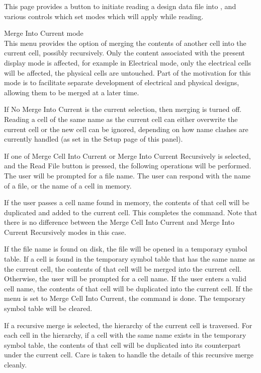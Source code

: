 This page provides a button to initiate reading a design data file
into {\Xic}, and various controls which set modes which will apply
while reading.

\begin{description}
\item{\cb Merge Into Current mode}\\
This menu provides the option of merging the contents of another cell
into the current cell, possibly recursively.  Only the content
associated with the present display mode is affected, for example in
Electrical mode, only the electrical cells will be affected, the
physical cells are untouched.  Part of the motivation for this mode is
to facilitate separate development of electrical and physical designs,
allowing them to be merged at a later time.

If {\cb No Merge Into Current} is the current selection, then merging
is turned off.  Reading a cell of the same name as the current cell
can either overwrite the current cell or the new cell can be ignored,
depending on how name clashes are currently handled (as set in the
{\cb Setup} page of this panel).

If one of {\cb Merge Cell Into Current} or {\cb Merge Into Current
Recursively} is selected, and the {\cb Read File} button is pressed,
the following operations will be performed.  The user will be prompted
for a file name.  The user can respond with the name of a file, or the
name of a cell in memory.

If the user passes a cell name found in memory, the contents of that
cell will be duplicated and added to the current cell.  This completes
the command.  Note that there is no difference between the {\cb Merge
Cell Into Current} and {\cb Merge Into Current Recursively} modes in
this case.

If the file name is found on disk, the file will be opened in a
temporary symbol table.  If a cell is found in the temporary symbol
table that has the same name as the current cell, the contents of that
cell will be merged into the current cell.  Otherwise, the user will
be prompted for a cell name.  If the user enters a valid cell name,
the contents of that cell will be duplicated into the current cell. 
If the menu is set to {\cb Merge Cell Into Current}, the command is
done.  The temporary symbol table will be cleared.

If a recursive merge is selected, the hierarchy of the current cell is
traversed.  For each cell in the hierarchy, if a cell with the same
name exists in the temporary symbol table, the contents of that cell
will be duplicated into its counterpart under the current cell.  Care
is taken to handle the details of this recursive merge cleanly.


\end{description}
